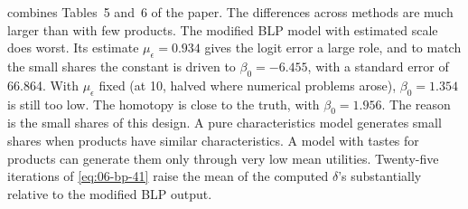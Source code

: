  combines Tables~5 and~6 of the paper. The differences across methods are much larger than with few
products. The modified BLP model with estimated scale does worst. Its estimate $\mu_\epsilon = 0.934$ gives the logit error
a large role, and to match the small shares the constant is driven to $\beta_0 = -6.455$, with a standard error of 66.864. With
$\mu_\epsilon$ fixed (at 10, halved where numerical problems arose), $\beta_0 = 1.354$ is still too low. The homotopy is close
to the truth, with $\beta_0 = 1.956$. The reason is the small shares of this design. A pure characteristics model generates
small shares when products have similar characteristics. A model with tastes for products can generate them only through
very low mean utilities. Twenty-five iterations of \eqref{eq:06-bp-41} raise the mean of the computed $\delta$'s
substantially relative to the modified BLP output.


